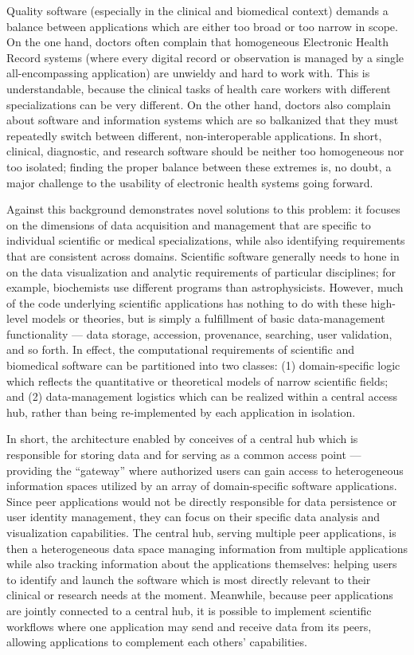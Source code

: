 \documentclass[11pt,letterpaper]{article}
\newcommand{\textscc}[1]{{\color{orr!35!black}{{%
						\fontfamily{Cabin-TLF}\fontseries{b}\selectfont{\textsc{\scriptsize{#1}}}}}}}
\newcommand{\AcronymText}[1]{{\textscc{#1}}}
\newcommand{\CRtwo}{{\resizebox{!}{7pt}{\AcronymText{CR2}}}}
\newcommand{\p}[1]{

\vspace{.7em}#1}
\newcommand{\q}[1]{{\fontfamily{qcr}\selectfont ``}#1{\fontfamily{qcr}\selectfont ''}}
\begin{document}
{\p{Quality software (especially in the clinical and 
biomedical context) demands a balance between 
applications which are either too broad or too narrow 
in scope.  On the one hand, doctors often complain 
that homogeneous Electronic Health Record systems (where 
every digital record or observation is managed by a single 
all-encompassing application) are unwieldy and hard to work 
with.  This is understandable, because the clinical tasks 
of health care workers with different specializations can be very 
different.  On the other hand, doctors also complain about 
software and information systems which are so balkanized 
that they must repeatedly switch between different, non-interoperable 
applications.  In short, clinical, diagnostic, and research software 
should be neither too homogeneous nor too isolated; finding the 
proper balance between these extremes is, no doubt, 
a major challenge to the usability of electronic health 
systems going forward.}

\p{Against this background \CRtwo{} demonstrates novel 
solutions to this problem: it focuses on the dimensions 
of data acquisition and management that are specific 
to individual scientific or medical specializations, 
while also identifying requirements that are 
consistent across domains.  Scientific software 
generally needs to hone in 
on the data visualization and analytic 
requirements of particular disciplines; for example, 
biochemists use different programs than 
astrophysicists.  However, much 
of the code underlying scientific applications 
has nothing to do with these high-level 
models or theories, but is simply a 
fulfillment of basic data-management 
functionality --- data storage, accession, provenance, 
searching, user validation, and so forth.  
In effect, the computational requirements 
of scientific and biomedical software can 
be partitioned into two classes: (1) 
domain-specific logic which reflects the 
quantitative or theoretical models of 
narrow scientific fields; and (2) 
data-management logistics which can be 
realized within a central access hub, rather 
than being re-implemented by each application 
in isolation.}

\p{In short, the architecture enabled by \CRtwo{} 
conceives of a central hub which is responsible for storing 
data and for serving as a common access point 
--- providing the \q{gateway} where authorized 
users can gain access to heterogeneous information 
spaces utilized by an array of domain-specific 
software applications.  Since peer applications  
would not be directly responsible for data persistence 
or user identity management, they can focus 
on their specific data analysis and visualization 
capabilities.  The central hub, serving multiple 
peer applications, is then a heterogeneous data space 
managing information from multiple applications while 
also tracking information about the applications 
themselves: helping users to identify and launch the 
software which is most directly relevant to their 
clinical or research needs at the moment.  Meanwhile, 
because peer applications are jointly connected to a 
central hub, it is possible to implement scientific 
workflows where one application may send and receive 
data from its peers, allowing applications to complement 
each others' capabilities.}

}
\end{document}
